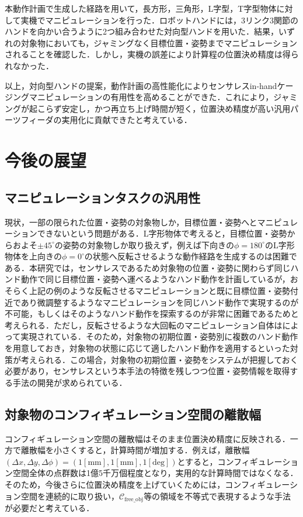 \documentclass[a4paper,twoside,12pt,papersize, dvipdfmx]{iirthesis}
\begin{document}
本動作計画で生成した経路を用いて，長方形，三角形，L字型，T字型物体に対して実機でマニピュレーションを行った．ロボットハンドには，3リンク3関節のハンドを向かい合うように2つ組み合わせた対向型ハンドを用いた．結果，いずれの対象物においても，ジャミングなく目標位置・姿勢までマニピュレーションされることを確認した．しかし，実機の誤差により計算程の位置決め精度は得られなかった．

以上，対向型ハンドの提案，動作計画の高性能化によりセンサレスin-handケージングマニピュレーションの有用性を高めることができた．これにより，ジャミングが起こらず安定し，かつ再立ち上げ時間が短く，位置決め精度が高い汎用パーツフィーダの実用化に貢献できたと考えている．

\section{今後の展望}\label{sec::conclusion::future}
\subsection*{マニピュレーションタスクの汎用性}
現状，一部の限られた位置・姿勢の対象物しか，目標位置・姿勢へとマニピュレーションできないという問題がある．L字形物体で考えると，目標位置・姿勢からおよそ$\pm 45^\circ$の姿勢の対象物しか取り扱えず，例えば下向きの$\phi=180^\circ$のL字形物体を上向きの$\phi=0^\circ$の状態へ反転させるような動作経路を生成するのは困難である．本研究では，センサレスであるため対象物の位置・姿勢に関わらず同じハンド動作で同じ目標位置・姿勢へ運べるようなハンド動作を計画しているが，おそらく上記の例のような反転させるマニピュレーションと既に目標位置・姿勢付近であり微調整するようなマニピュレーションを同じハンド動作で実現するのが不可能，もしくはそのようなハンド動作を探索するのが非常に困難であるためと考えられる．ただし，反転させるような大回転のマニピュレーション自体は\cite{kamikukita2022}によって実現されている．そのため，対象物の初期位置・姿勢別に複数のハンド動作を用意しておき，対象物の状態に応じて適したハンド動作を適用するといった対策が考えられる．この場合，対象物の初期位置・姿勢をシステムが把握しておく必要があり，センサレスという本手法の特徴を残しつつ位置・姿勢情報を取得する手法の開発が求められている．

\subsection*{対象物のコンフィギュレーション空間の離散幅}
コンフィギュレーション空間の離散幅はそのまま位置決め精度に反映される．一方で離散幅を小さくすると，計算時間が増加する．例えば，離散幅$(\Delta x, \Delta y, \Delta \phi)=(1 \mathrm{[mm]}, 1 \mathrm{[mm]}, 1 \mathrm{[deg]})$とすると，コンフィギュレーション空間全体の点群数は1億5千万個程度となり，実用的な計算時間ではなくなる．そのため，今後さらに位置決め精度を上げていくためには，コンフィギュレーション空間を連続的に取り扱い，$\mathcal{C}_{\mathrm{free\_obj}}$等の領域を不等式で表現するような手法が必要だと考えている．
\end{document}
